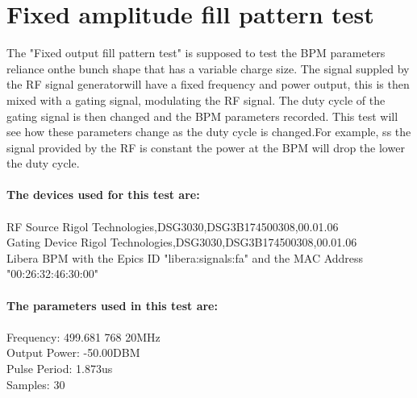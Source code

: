\documentclass[a4paper, 11pt]{article}%
\begin{document}
\section{Fixed amplitude fill pattern test}%
The "Fixed output fill pattern test" is supposed to test the BPM parameters reliance onthe bunch shape that has a variable charge size. The signal suppled by the RF signal generatorwill have a fixed frequency and power output, this is then mixed with a gating signal, modulating the RF signal. The duty cycle of the gating signal is then changed and the BPM parameters recorded. This test will see how these parameters change as the duty cycle is changed.For example, ss the signal provided by the RF is constant the power at the BPM will drop the lower the duty cycle.\\\\%
\textbf{The devices used for this test are:}\\\\%
RF Source Rigol Technologies,DSG3030,DSG3B174500308,00.01.06\\%
Gating Device Rigol Technologies,DSG3030,DSG3B174500308,00.01.06\\%
Libera BPM with the Epics ID "libera:signals:fa" and the MAC Address "00:26:32:46:30:00"\\%
\\%
\textbf{The parameters used in this test are:}\\\\%
Frequency: 499.681 768 20MHz\\%
Output Power: -50.00DBM\\%
Pulse Period: 1.873us\\%
Samples: 30\\
\end{document}
